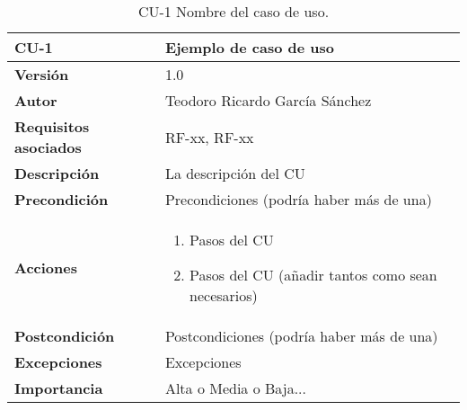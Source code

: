 \begin{table}[p]
	\centering
	\begin{tabularx}{\linewidth}{ p{} p{} }
		\toprule
		\textbf{CU-1}    & \textbf{Ejemplo de caso de uso}\\
		\toprule
		\textbf{Versión}              & 1.0    \\
		\textbf{Autor}                & Teodoro Ricardo García Sánchez \\
		\textbf{Requisitos asociados} & RF-xx, RF-xx \\
		\textbf{Descripción}          & La descripción del CU \\
		\textbf{Precondición}         & Precondiciones (podría haber más de una) \\
		\textbf{Acciones}             &
		\begin{enumerate}
			\def\labelenumi{\arabic{enumi}.}
			\tightlist
			\item Pasos del CU
			\item Pasos del CU (añadir tantos como sean necesarios)
		\end{enumerate}\\
		\textbf{Postcondición}        & Postcondiciones (podría haber más de una) \\
		\textbf{Excepciones}          & Excepciones \\
		\textbf{Importancia}          & Alta o Media o Baja... \\
		\bottomrule
	\end{tabularx}
	\caption{CU-1 Nombre del caso de uso.}
\end{table}



